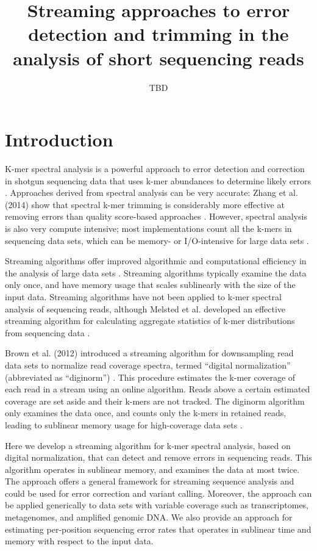 \documentclass{article}
\begin{document}
\title{Streaming approaches to error detection and trimming in the analysis of
short sequencing reads}
\author{TBD}
\maketitle

\section{Introduction}

K-mer spectral analysis is a powerful approach to error detection and
correction in shotgun sequencing data that uses k-mer abundances to
determine likely errors \cite{Pevzner2001}.  Approaches derived from
spectral analysis can be very accurate: Zhang et al. (2014) show that
spectral k-mer trimming is considerably more effective at removing
errors than quality score-based approaches \cite{Zhang2014}.  However,
spectral analysis is also very compute intensive; most implementations
count all the k-mers in sequencing data sets, which can be memory- or
I/O-intensive for large data sets \cite{Zhang2014}.

Streaming algorithms offer improved algorithmic and computational
efficiency in the analysis of large data sets \cite{Charikar2004,
  Cormode2005}.  Streaming algorithms typically examine the data only
once, and have memory usage that scales sublinearly with the size of
the input data.  Streaming algorithms have not been applied to k-mer
spectral analysis of sequencing reads, although Melsted et
al. developed an effective streaming algorithm for calculating
aggregate statistics of k-mer distributions from sequencing data
\cite{Melsted2014}.

Brown et al. (2012) introduced a streaming algorithm for downsampling
read data sets to normalize read coverage spectra, termed ``digital
normalization'' (abbreviated as ``diginorm'') \cite{Brown2012}.  This
procedure estimates the k-mer coverage of each read in a stream using
an online algorithm. Reads above a certain estimated coverage are set
aside and their k-mers are not tracked.  The diginorm algorithm only
examines the data once, and counts only the k-mers in retained reads,
leading to sublinear memory usage for high-coverage data sets
\cite{Brown2012}.

Here we develop a streaming algorithm for k-mer spectral analysis,
based on digital normalization, that can detect and remove errors in
sequencing reads.  This algorithm operates in sublinear memory, and
examines the data at most twice.  The approach offers a general
framework for streaming sequence analysis and could be used for error
correction and variant calling.  Moreover, the approach can be applied
generically to data sets with variable coverage such as
transcriptomes, metagenomes, and amplified genomic DNA.  We also
provide an approach for estimating per-position sequencing error rates
that operates in sublinear time and memory with respect to the input
data.
\end{document}
